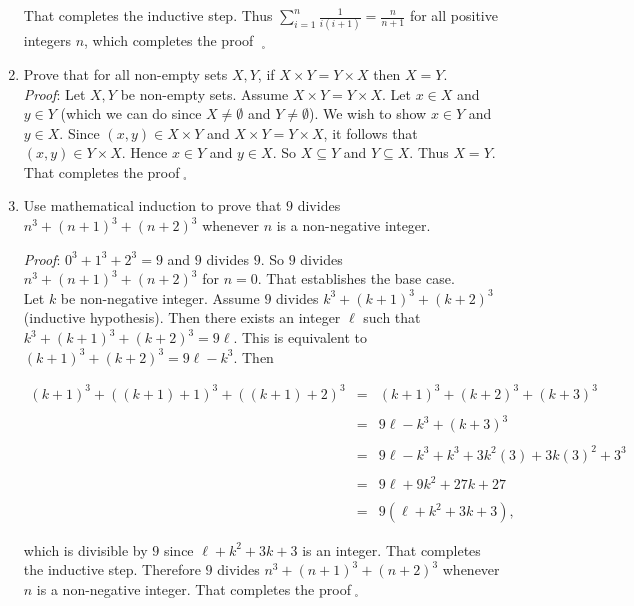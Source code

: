\documentclass[12pt]{amsart}
\theoremstyle{definition}
\theoremstyle{remark}
\begin{document}
\begin{enumerate}
{That completes the inductive step.  Thus $\displaystyle \sum_{i=1}^n \frac{1}{i(i+1)}=\frac{n}{n+1}$ for all positive integers $n$, which completes the proof $\;_{\square}$
}

\newpage


\item  Prove that for all non-empty sets $X,Y$, if $X\times Y=Y\times X$ then $X=Y$.\\

{\color{red} \emph{Proof}:  Let $X,Y$ be non-empty sets.  Assume $X\times Y=Y\times X$.  Let $x\in X$ and $y\in Y$ (which we can do since $X\neq\emptyset$ and $Y\neq\emptyset$).  We wish to show $x\in Y$ and $y\in X$.  Since $(x,y)\in X\times Y$ and $X\times Y=Y\times X$, it follows that $(x,y)\in Y\times X$.  Hence $x\in Y$ and $y\in X$.  So $X\subseteq Y$ and $Y\subseteq X$.
Thus $X=Y$.  That completes the proof$\;_{\square}$}


\newpage

\item Use mathematical induction to prove that $9$ divides $n^{3}+(n+1)^{3}+(n+2)^{3}$ whenever $n$ is a non-negative integer.\\

{\color{red} \emph{Proof}: $0^3+1^3+2^3=9$ and $9$ divides $9$.  So $9$ divides $n^{3}+(n+1)^{3}+(n+2)^{3}$ for $n=0$.  That establishes the base case.  \\

Let $k$ be non-negative integer.  Assume  $9$ divides $k^{3}+(k+1)^{3}+(k+2)^{3}$ (inductive hypothesis).  Then there exists an integer $\ell$ such that  $k^{3}+(k+1)^{3}+(k+2)^{3}=9\ell$.  This is equivalent to $(k+1)^{3}+(k+2)^{3}=9\ell -k^3$. Then


\begin{eqnarray*}
(k+1)^{3}+((k+1)+1)^{3}+((k+1)+2)^{3} &=& (k+1)^{3}+(k+2)^{3}+(k+3)^{3}\\
\\
&=& 9\ell -k^3+ (k+3)^{3}\\
\\
&=& 9\ell -k^3+ k^3+3k^2 (3)+3k(3)^2+3^3\\
\\
&=& 9\ell +9k^2 +27k+27\\
\\
&=& 9(\ell +k^2 +3k+3),\end{eqnarray*}


which is divisible by $9$ since $\ell +k^2 +3k+3$ is an integer.  That completes the inductive step.  Therefore $9$ divides $n^{3}+(n+1)^{3}+(n+2)^{3}$ whenever $n$ is a non-negative integer.  That completes the proof$\;_{\square}$ }\\




\end{enumerate}
\end{document}
